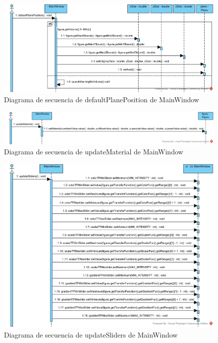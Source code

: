 \begin{figure}[H]
	\centering
	\includegraphics[width=12cm]{imagenes/diagramas/secuencia/MainWindow_DefaultPlanePosition}
	\caption{Diagrama de secuencia de defaultPlanePosition de MainWindow}
	\label{fig:diagrama_secuencia_mainWindow_defaultPlanePosition}
\end{figure}

\begin{figure}[H]
	\centering
	\includegraphics[width=12cm]{imagenes/diagramas/secuencia/MainWindow_UpdateMaterial}
	\caption{Diagrama de secuencia de updateMaterial de MainWindow}
	\label{fig:diagrama_secuencia_mainWindow_updateMaterial}
\end{figure}

\begin{figure}[H]
	\centering
	\includegraphics[width=12cm]{imagenes/diagramas/secuencia/MainWindow_UpdateSliders}
	\caption{Diagrama de secuencia de updateSliders de MainWindow}
	\label{fig:diagrama_secuencia_mainWindow_updateSliders}
\end{figure}


